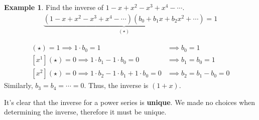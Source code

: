 \documentclass[]{article}
\theoremstyle{definition}
\newtheorem{ex}{Example}[section]
\begin{document}
			\begin{ex}
				Find the inverse of $1 - x + x^2 - x^3 + x^4 - \cdots$.
				\begin{align*}
					\underbrace{(1 - x + x^2 - x^3 + x^4 - \cdots)(b_0 + b_1x + b_2x^2 + \cdots)}_{(\star)} = 1
				\end{align*}
				
				\begin{align*}
					[x^0](\star) = 1 \implies 1 \cdot b_0 = 1 &\implies b_0 = 1 \\
					[x^1](\star) = 0 \implies 1 \cdot b_1 - 1 \cdot b_0 = 0 &\implies b_1 = b_0 = 1 \\
					[x^2](\star) = 0 \implies 1 \cdot b_2 - 1 \cdot b_1 + 1 \cdot b_0 = 0 &\implies b_2 = b_1 - b_0 = 0
				\end{align*}
				Similarly, $b_3 = b_4 = \cdots = 0$. Thus, the inverse is $(1 + x)$.
			\end{ex}

			It's clear that the inverse for a power series is \textbf{unique}. We made no choices when determining the inverse, therefore it must be unique.
\end{document}

